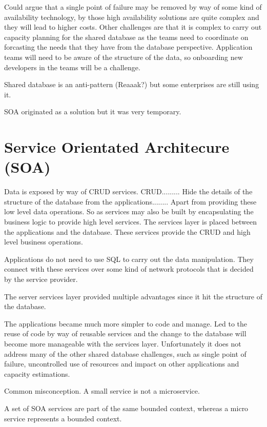 \documentclass[a4paper, 11pt]{book}
\begin{document}
    Could argue that a single point of failure may be removed by way of some kind of availability technology, by those high availability solutions are quite complex and they will lead to higher costs.
    Other challenges are that it is complex to carry out capacity planning for the shared database as the teams need to coordinate on forcasting the needs that they have from the database perspective.
    Application teams will need to be aware of the structure of the data, so onboarding new developers in the teams will be a challenge.

    Shared database is an anti-pattern (Reaaak?) but some enterprises are still using it.

    SOA originated as a solution but it was very temporary.


    \section{Service Orientated Architecure (SOA)}
    Data is exposed by way of CRUD services.
    CRUD.........
    Hide the details of the structure of the database from the applications........
    Apart from providing these low level data operations.
    So as services may also be built by encapsulating the business logic to provide high level services.
    The services layer is placed between the applications and the database.
    These services provide the CRUD and high level business operations.

    Applications do not need to use SQL to carry out the data manipulation.
    They connect with these services over some kind of network protocols that is decided by the service provider.

    The server services layer provided multiple advantages since it hit the structure of the database.

    The applications became much more simpler to code and manage.
    Led to the reuse of code by way of reusable services and the change to the database will become more manageable with the services layer.
    Unfortunately it does not address many of the other shared database challenges, such as single point of failure, uncontrolled use of resources and impact on other applications and capacity estimations.

    Common misconception.
    A small service is not a microservice.

    A set of SOA services are part of the same bounded context, whereas a micro service represents a bounded context.
\end{document}
